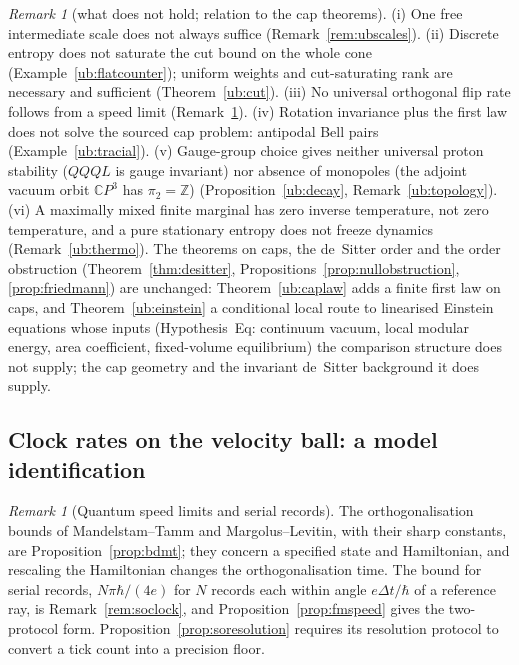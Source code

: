 \documentclass[aps,pra,onecolumn,superscriptaddress,nofootinbib,10pt]{revtex4-2}
\theoremstyle{definition}
\theoremstyle{remark}
\newtheorem{remark}[theorem]{Remark}
\newcommand{\C}{\mathbb{C}}
\newcommand{\Z}{\mathbb{Z}}
\begin{document}
\begin{remark}[what does not hold; relation to the cap theorems]\label{rem:ubnogo}
(i) One free intermediate scale does not always suffice (Remark~\ref{rem:ubscales}).  (ii) Discrete entropy does not
saturate the cut bound on the whole cone (Example~\ref{ub:flatcounter}); uniform weights and cut-saturating rank are
necessary and sufficient (Theorem~\ref{ub:cut}).  (iii) No universal orthogonal flip rate follows from a speed limit
(Remark~\ref{ub:qsl}).  (iv) Rotation invariance plus the first law does not solve the sourced cap problem: antipodal
Bell pairs (Example~\ref{ub:tracial}).  (v) Gauge-group choice gives neither universal proton stability ($QQQL$ is
gauge invariant) nor absence of monopoles (the adjoint vacuum orbit $\C P^3$ has $\pi_2=\Z$) (Proposition~\ref{ub:decay},
Remark~\ref{ub:topology}).  (vi) A maximally mixed finite marginal has zero inverse temperature, not zero
temperature, and a pure stationary entropy does not freeze dynamics (Remark~\ref{ub:thermo}).  The theorems on
caps, the de~Sitter order and the order obstruction (Theorem~\ref{thm:desitter}, Propositions~\ref{prop:nullobstruction},
\ref{prop:friedmann}) are unchanged: Theorem~\ref{ub:caplaw} adds a finite first law on caps, and
Theorem~\ref{ub:einstein} a conditional local route to linearised Einstein equations whose inputs (Hypothesis~Eq:
continuum vacuum, local modular energy, area coefficient, fixed-volume equilibrium) the comparison structure
does not supply; the cap geometry and the invariant de~Sitter background it does supply.
\end{remark}

\subsection{Clock rates on the velocity ball: a model identification}

\begin{remark}[Quantum speed limits and serial records]\label{ub:qsl}
The orthogonalisation bounds of Mandelstam--Tamm and Margolus--Levitin, with their sharp constants, are
Proposition~\ref{prop:bdmt}; they concern a specified state and Hamiltonian, and rescaling the Hamiltonian
changes the orthogonalisation time.  The bound for serial records, $N\pi\hbar/(4e)$ for $N$ records each within angle
$e\Delta t/\hbar$ of a reference ray, is Remark~\ref{rem:soclock}, and Proposition~\ref{prop:fmspeed} gives the two-protocol form.
Proposition~\ref{prop:soresolution} requires its resolution protocol to convert a tick count into a precision floor.
\end{remark}
\end{document}
